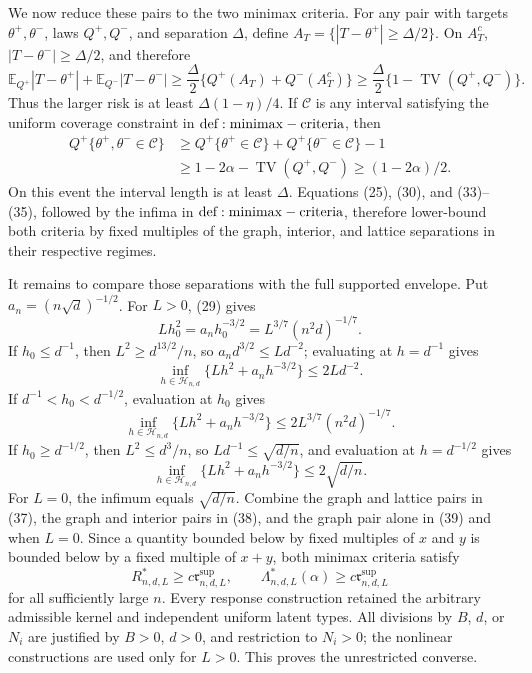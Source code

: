 We now reduce these pairs to the two minimax criteria.  For any pair with targets \(\theta^+,\theta^-\), laws \(Q^+,Q^-\), and separation \(\Delta\), define \(A_T=\{|T-\theta^+|\geq\Delta/2\}\).  On \(A_T^c\), \(|T-\theta^-|\geq\Delta/2\), and therefore
\[
 \mathbb E_{Q^+}|T-\theta^+|+\mathbb E_{Q^-}|T-\theta^-|
 \geq\frac\Delta2\{Q^+(A_T)+Q^-(A_T^c)\}
 \geq\frac\Delta2\{1-\operatorname{TV}(Q^+,Q^-)\}.
\tag{34}
\]
Thus the larger risk is at least \(\Delta(1-\eta)/4\).  If \(\mathcal C\) is any interval satisfying the uniform coverage constraint in \({\rm def:minimax-criteria}\), then
\[
\begin{aligned}
 Q^+\{\theta^+,\theta^-\in\mathcal C\}
 &\geq Q^+\{\theta^+\in\mathcal C\}+Q^+\{\theta^-\in\mathcal C\}-1\\
 &\geq1-2\alpha-\operatorname{TV}(Q^+,Q^-)\geq(1-2\alpha)/2.
\end{aligned}
\tag{35}
\]
On this event the interval length is at least \(\Delta\).  Equations (25), (30), and (33)--(35), followed by the infima in \({\rm def:minimax-criteria}\), therefore lower-bound both criteria by fixed multiples of the graph, interior, and lattice separations in their respective regimes.

It remains to compare those separations with the full supported envelope.  Put \(a_n=(n\sqrt d)^{-1/2}\).  For \(L>0\), (29) gives
\[
 Lh_0^2=a_nh_0^{-3/2}=L^{3/7}(n^2d)^{-1/7}.
\tag{36}
\]
If \(h_0\leq d^{-1}\), then \(L^2\geq d^{13/2}/n\), so \(a_nd^{3/2}\leq Ld^{-2}\); evaluating at \(h=d^{-1}\) gives
\[
 \inf_{h\in\mathcal H_{n,d}}\{Lh^2+a_nh^{-3/2}\}\leq2Ld^{-2}.
\tag{37}
\]
If \(d^{-1}<h_0<d^{-1/2}\), evaluation at \(h_0\) gives
\[
 \inf_{h\in\mathcal H_{n,d}}\{Lh^2+a_nh^{-3/2}\}
 \leq2L^{3/7}(n^2d)^{-1/7}.
\tag{38}
\]
If \(h_0\geq d^{-1/2}\), then \(L^2\leq d^3/n\), so \(Ld^{-1}\leq\sqrt{d/n}\), and evaluation at \(h=d^{-1/2}\) gives
\[
 \inf_{h\in\mathcal H_{n,d}}\{Lh^2+a_nh^{-3/2}\}\leq2\sqrt{d/n}.
\tag{39}
\]
For \(L=0\), the infimum equals \(\sqrt{d/n}\).  Combine the graph and lattice pairs in (37), the graph and interior pairs in (38), and the graph pair alone in (39) and when \(L=0\).  Since a quantity bounded below by fixed multiples of \(x\) and \(y\) is bounded below by a fixed multiple of \(x+y\), both minimax criteria satisfy
\[
 R^*_{n,d,L}\geq c\mathfrak r^{\mathrm{sup}}_{n,d,L},
 \qquad \Lambda^*_{n,d,L}(\alpha)\geq c\mathfrak r^{\mathrm{sup}}_{n,d,L}
\tag{40}
\]
for all sufficiently large \(n\).  Every response construction retained the arbitrary admissible kernel and independent uniform latent types.  All divisions by \(B\), \(d\), or \(N_i\) are justified by \(B>0\), \(d>0\), and restriction to \(N_i>0\); the nonlinear constructions are used only for \(L>0\).  This proves the unrestricted converse.